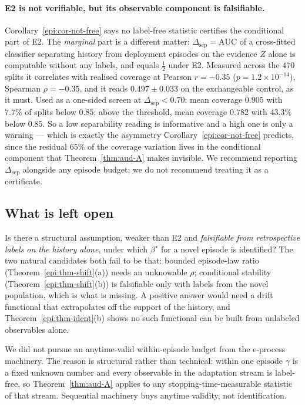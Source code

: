 \paragraph{E2 is not verifiable, but its observable component is falsifiable.}
Corollary~\ref{epi:cor-not-free} says no label-free statistic certifies the conditional part of E2.
The \emph{marginal} part is a different matter: $\Delta_{\mathrm{sep}}=\mathrm{AUC}$ of a
cross-fitted classifier separating history from deployment episodes on the evidence $Z$ alone is
computable without any labels, and equals $\tfrac12$ under E2. Measured across the $470$ splits it
correlates with realised coverage at Pearson $r=-0.35$ ($p=1.2\times10^{-14}$), Spearman
$\rho=-0.35$, and it reads $0.497\pm0.033$ on the exchangeable control, as it must. Used as a
one-sided screen at $\Delta_{\mathrm{sep}}<0.70$: mean coverage $0.905$ with $7.7\%$ of splits below
$0.85$; above the threshold, mean coverage $0.782$ with $43.3\%$ below $0.85$. So a low separability
reading is informative and a high one is only a warning --- which is exactly the asymmetry
Corollary~\ref{epi:cor-not-free} predicts, since the residual $65\%$ of the coverage variation lives
in the conditional component that Theorem~\ref{thm:aud-A} makes invisible. We recommend reporting
$\Delta_{\mathrm{sep}}$ alongside any episode budget; we do not recommend treating it as a
certificate.

\subsection{What is left open}

\begin{conjecture}\label{epi:conj-open}
Is there a structural assumption, weaker than E2 and \emph{falsifiable from retrospective labels on
the history alone}, under which $\beta^\star$ for a novel episode is identified? The two natural
candidates both fail to be that: bounded episode-law ratio (Theorem~\ref{epi:thm-shift}(a)) needs an
unknowable $\rho$; conditional stability (Theorem~\ref{epi:thm-shift}(b)) is falsifiable only with
labels from the novel population, which is what is missing. A positive answer would need a drift
functional that extrapolates off the support of the history, and
Theorem~\ref{epi:thm-ident}(b) shows no such functional can be built from unlabeled observables
alone.
\end{conjecture}

We did not pursue an anytime-valid within-episode budget from the e-process machinery. The reason is
structural rather than technical: within one episode $\gamma$ is a fixed unknown number and every
observable in the adaptation stream is label-free, so Theorem~\ref{thm:aud-A} applies to any
stopping-time-measurable statistic of that stream. Sequential machinery buys anytime validity, not
identification.
